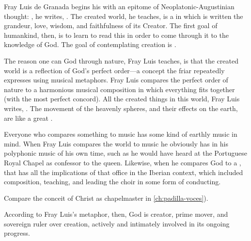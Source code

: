 Fray Luis de Granada begins his  with an
epitome of Neoplatonic-Augustinian thought: , he writes, .%
    \Autocite[182]{LuisdeGranada:Simbolo}
The created world, he teaches, is a  in which is written
the grandeur, love, wisdom, and faithfulness of its Creator.
The first goal of humankind, then, is to learn to read this  in order to come through it to the knowledge of God. 
The goal of contemplating creation is .%
    \Autocite[184]{LuisdeGranada:Simbolo}

The reason one can  God through nature, Fray Luis teaches, is that
the created world is a reflection of God's perfect order---a concept the friar
repeatedly expresses using musical metaphors.
Fray Luis compares the perfect order of nature to a harmonious musical
composition in which everything fits together 
(with the most perfect concord).
All the created things in this world, Fray Luis writes, .%
    \Autocite[191]{LuisdeGranada:Simbolo}
The movement of the heavenly spheres, and their effects on the earth, are like
a great .%
    \Autocite[191]{LuisdeGranada:Simbolo}

Everyone who compares something to music has some kind of earthly music in
mind.
When Fray Luis compares the world to music  he
obviously has in his  polyphonic music of his own time, such
as he would have heard at the Portuguese Royal Chapel as confessor to the
queen.%
Likewise, when he compares God to a , that has all
the implications of that office in the Iberian context, which included
composition, teaching, and leading the choir in some form of conducting.%
\begin{Footnote}
    Compare the conceit of Christ as chapelmaster in \cref{ch:padilla-voces}).
\end{Footnote}
According to Fray Luis's metaphor, then, God is creator, prime mover, and
sovereign ruler over creation, actively and intimately involved in its ongoing
progress.

